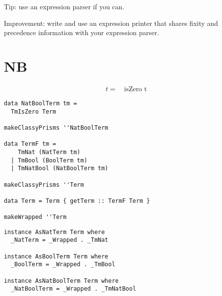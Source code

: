 \documentclass{beamer}
\begin{document}
\begin{frame}[c]
  \begin{center}
Tip: use an expression parser if you can.
  \end{center}
\end{frame}

\begin{frame}[c]
  \begin{center}
Improvement: write and use an expression printer that shares fixity and
precedence information with your expression parser.
  \end{center}
\end{frame}

\section{NB}

\begin{frame}[c]
  \begin{displaymath}
    \begin{aligned}
t =& \ \text{isZero t}
    \end{aligned}
  \end{displaymath}
\end{frame}

\begin{frame}[fragile]
  \begin{verbatim}
data NatBoolTerm tm =
  TmIsZero Term

makeClassyPrisms ''NatBoolTerm

data TermF tm =
    TmNat (NatTerm tm)
  | TmBool (BoolTerm tm)
  | TmNatBool (NatBoolTerm tm)

makeClassyPrisms ''Term

data Term = Term { getTerm :: TermF Term }

makeWrapped ''Term
  \end{verbatim}
\end{frame} 

\begin{frame}[fragile]
  \begin{verbatim}
instance AsNatTerm Term where
  _NatTerm = _Wrapped . _TmNat

instance AsBoolTerm Term where
  _BoolTerm = _Wrapped . _TmBool

instance AsNatBoolTerm Term where
  _NatBoolTerm = _Wrapped . _TmNatBool
  \end{verbatim}
\end{frame} 
\end{document}
